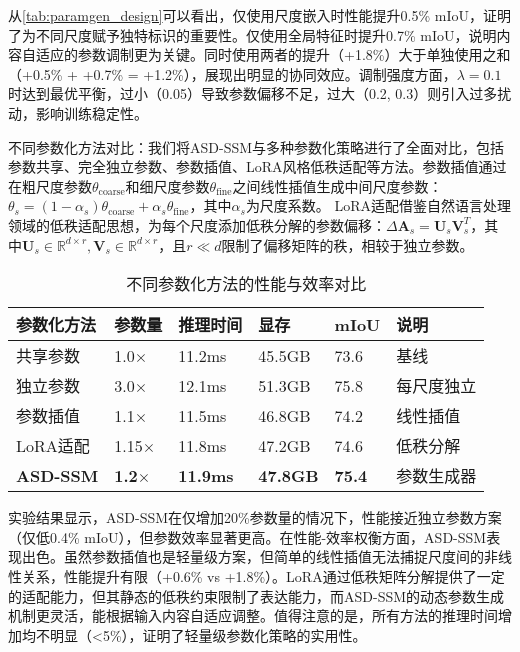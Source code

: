 \documentclass[preprint,12pt]{elsarticle}
\begin{document}
从\cref{tab:paramgen_design}可以看出，仅使用尺度嵌入时性能提升0.5\% mIoU，证明了为不同尺度赋予独特标识的重要性。仅使用全局特征时提升0.7\% mIoU，说明内容自适应的参数调制更为关键。同时使用两者的提升（+1.8\%）大于单独使用之和（+0.5\% + +0.7\% = +1.2\%），展现出明显的协同效应。调制强度方面，$\lambda=0.1$时达到最优平衡，过小（0.05）导致参数偏移不足，过大（0.2, 0.3）则引入过多扰动，影响训练稳定性。

不同参数化方法对比：我们将ASD-SSM与多种参数化策略进行了全面对比，包括参数共享、完全独立参数、参数插值、LoRA风格低秩适配等方法。参数插值通过在粗尺度参数$\theta_{\text{coarse}}$和细尺度参数$\theta_{\text{fine}}$之间线性插值生成中间尺度参数：$\theta_s = (1-\alpha_s)\theta_{\text{coarse}} + \alpha_s\theta_{\text{fine}}$，其中$\alpha_s$为尺度系数。
LoRA适配借鉴自然语言处理领域的低秩适配思想\cite{lora}，为每个尺度添加低秩分解的参数偏移：$\Delta\mathbf{A}_s = \mathbf{U}_s\mathbf{V}_s^T$，其中$\mathbf{U}_s \in \mathbb{R}^{d \times r}, \mathbf{V}_s \in \mathbb{R}^{d \times r}$，且$r \ll d$限制了偏移矩阵的秩，相较于独立参数。

\begin{table}[htbp!]
	\centering
	\caption{不同参数化方法的性能与效率对比}
	\label{tab:parameterization_comparison}
	\begin{tabular}{@{}llllll@{}}
		\toprule
		参数化方法 & 参数量 & 推理时间 & 显存 & mIoU & 说明 \\ 
		\midrule
		共享参数 & 1.0$\times$ & 11.2ms & 45.5GB & 73.6 & 基线 \\
		\midrule
		独立参数 & 3.0$\times$ & 12.1ms & 51.3GB & 75.8 & 每尺度独立 \\
		参数插值 & 1.1$\times$ & 11.5ms & 46.8GB & 74.2 & 线性插值 \\
		LoRA适配 & 1.15$\times$ & 11.8ms & 47.2GB & 74.6 & 低秩分解 \\
		\textbf{ASD-SSM} & \textbf{1.2$\times$} & \textbf{11.9ms} & \textbf{47.8GB} & \textbf{75.4} & 参数生成器 \\
		\bottomrule
	\end{tabular}
\end{table}

实验结果显示，ASD-SSM在仅增加20\%参数量的情况下，性能接近独立参数方案（仅低0.4\% mIoU），但参数效率显著更高。在性能-效率权衡方面，ASD-SSM表现出色。虽然参数插值也是轻量级方案，但简单的线性插值无法捕捉尺度间的非线性关系，性能提升有限（+0.6\% vs +1.8\%）。LoRA通过低秩矩阵分解提供了一定的适配能力，但其静态的低秩约束限制了表达能力，而ASD-SSM的动态参数生成机制更灵活，能根据输入内容自适应调整。值得注意的是，所有方法的推理时间增加均不明显（<5\%），证明了轻量级参数化策略的实用性。
\end{document}
